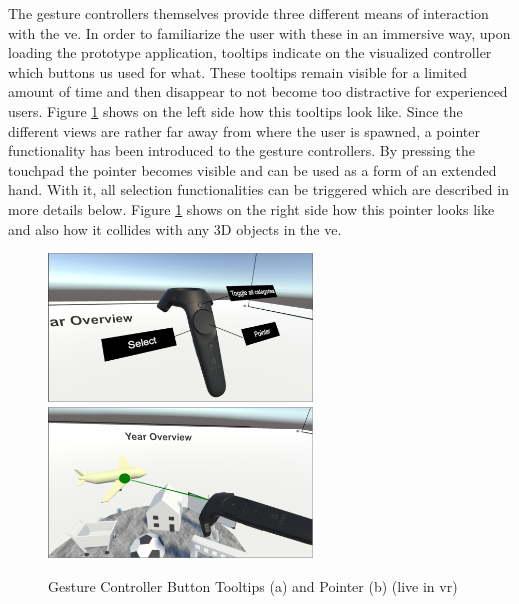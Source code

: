 The gesture controllers themselves provide three different means of interaction with the \gls{ve}. In order to familiarize the user with these in an immersive way, upon loading the prototype application, tooltips indicate on the visualized controller which buttons us used for what. These tooltips remain visible for a limited amount of time and then disappear to not become too distractive for experienced users. Figure \ref{fig:unitypointertooltips} shows on the left side how this tooltips look like. \newline
Since the different views are rather far away from where the user is spawned, a pointer functionality has been introduced to the gesture controllers. By pressing the touchpad the pointer becomes visible and can be used as a form of an extended hand. With it, all selection functionalities can be triggered which are described in more details below. Figure \ref{fig:unitypointertooltips} shows on the right side how this pointer looks like and also how it collides with any 3D objects in the \gls{ve}.
\begin{figure}[h]
	\begin{center}
		\includegraphics[width=7cm]{03_Figures/08_Development/Controller_Tooltips.png}
		\includegraphics[width=7cm]{03_Figures/08_Development/Controller_Pointer.png}
		\caption[Gesture Controller Button Tooltips and Pointer (live in \gls{vr})]{Gesture Controller Button Tooltips (a) and Pointer (b) (live in \gls{vr})}
		\label{fig:unitypointertooltips}
	\end{center}
\end{figure}

